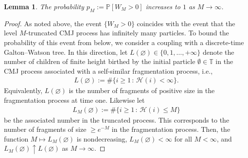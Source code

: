 \documentclass[a4,12pt]{amsart}
\numberwithin{equation}{section}
\newtheorem{lemma}[thm]{Lemma}
\begin{document}
\begin{lemma} \label{lem:mart}
	The probability $p_M := \mathbb{P}[ W_M > 0 ]$ increases to $1$ as $M \to\infty$.
\end{lemma}
\begin{proof}
	As noted above, the event $\{W_M > 0 \}$ coincides with the event that the level $M$-truncated CMJ process has 
	infinitely many particles. To bound the probability of this event from below, we consider a coupling with a 
	discrete-time Galton--Watson tree. 
	In this direction, let $L(\varnothing) \in \{0,1,\ldots,+\infty\}$ denote the number of children of finite height birthed 
	by the initial particle $\emptyset \in \mathbb{T}$ in the CMJ process associated with a self-similar fragmentation process, i.e.,
	\begin{align*}
		L(\varnothing) := \# \{ i \geq 1\,:\, \mathcal{H}(i) < \infty \}.
	\end{align*}
	Equivalently, $L(\varnothing)$ is the number of fragments of positive size in the fragmentation process at time one.
	Likewise let
	\begin{align*}
		L_M(\varnothing) := \# \{ i \geq 1\,:\,  \mathcal{H}(i) \leq M \}
	\end{align*}
	be the associated number in the truncated process. 
	This corresponds to the number of fragments of size $\geq e^{-M}$ in the fragmentation process.
	Then,  the function $M\mapsto L_{M}(\varnothing)$ is nondecreasing, 
	$L_M(\varnothing) < \infty$ for all $M < \infty$, and 
	$L_M(\varnothing) \uparrow L(\varnothing)$ as $M \to \infty$. 


\end{proof}
\end{document}
